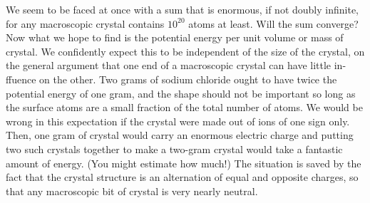 We seem to be faced at once with a sum that is enormous, if not
doubly infinite, for any macroscopic crystal contains $10^{20}$ atoms at
least. Will the sum converge? Now what we hope to find is the
potential energy per unit volume or mass of crystal. We confidently
expect this to be independent of the size of the crystal, on the general
argument that one end of a macroscopic crystal can have little in-
ffuence on the other. Two grams of sodium chloride ought to have
twice the potential energy of one gram, and the shape should not be
important so long as the surface atoms are a small fraction of the total
number of atoms. We would be wrong in this expectation if the crystal
were made out of ions of one sign only. Then, one gram of crystal
would carry an enormous electric charge and putting two such crystals
together to make a two-gram crystal would take a fantastic
amount of energy. (You might estimate how much!) The situation
is saved by the fact that the crystal structure is an alternation of equal
and opposite charges, so that any macroscopic bit of crystal is very
nearly neutral.


